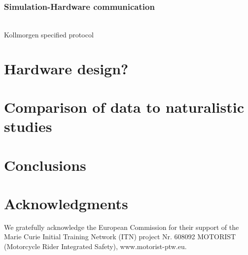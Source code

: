 \documentclass[11pt,a4paper,reqno]{amsart}
\begin{document}
\subsubsection{Simulation-Hardware communication} \\
Kollmorgen specified protocol \\

\section{Hardware design?}

\section{Comparison of data to naturalistic studies}

\section{Conclusions}

\section{Acknowledgments}
We gratefully acknowledge the European Commission for their support of the Marie Curie Initial Training Network (ITN)
project Nr. 608092 MOTORIST (Motorcycle Rider Integrated Safety), www.motorist-ptw.eu.



\end{document}

